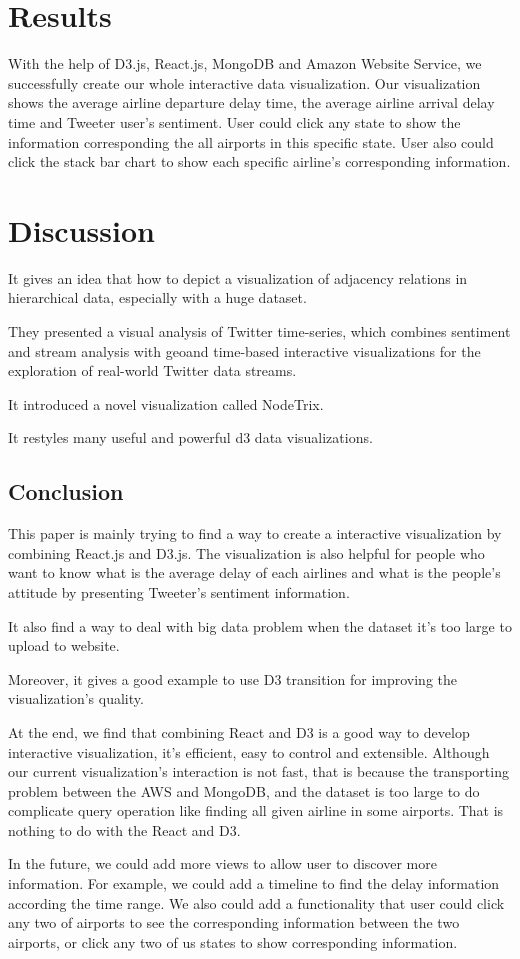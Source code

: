\section{Results}
With the help of D3.js, React.js, MongoDB and Amazon Website Service, we successfully create our whole interactive data visualization. Our visualization shows the average airline departure delay time, the average airline arrival delay time and Tweeter user's sentiment. User could click any state to show the information corresponding the all airports in this specific state. User also could click the stack bar chart to show each specific airline's corresponding information. 

\section{Discussion}
It gives an idea that how to depict a visualization of adjacency relations in hierarchical data, especially with a huge dataset. \cite{holten2006hierarchical}

They presented a visual analysis of Twitter time-series, which combines sentiment and stream analysis with geoand time-based interactive visualizations for the exploration of real-world Twitter data streams. \cite{hao2011visual}

It introduced a novel visualization called NodeTrix.\cite{henry2007nodetrix} 

It restyles many useful and powerful d3 data visualizations.\cite{harper2014deconstructing}




\subsection{Conclusion}
\label{sec:conclusion}
This paper is mainly trying to find a way to create a interactive visualization by combining React.js and D3.js. The visualization is also helpful for people who want to know what is the average delay of each airlines and what is the people's attitude by presenting Tweeter's sentiment information. 

It also find a way to deal with big data problem when the dataset it's too large to upload to website. 

Moreover, it gives a good example to use D3 transition for improving the visualization's quality.

At the end, we find that combining React and D3 is a good way to develop interactive visualization, it's efficient, easy to control and extensible. Although our current visualization's interaction is not fast, that is because the transporting problem between the AWS and MongoDB, and the dataset is too large to do complicate query operation like finding all given airline in some airports. That is nothing to do with the React and D3.

In the future, we could add more views to allow user to discover more information. For example, we could add a timeline to find the delay information according the time range. We also could add a functionality that user could click any two of airports to see the corresponding information between the two airports, or click any two of us states to show corresponding information.


